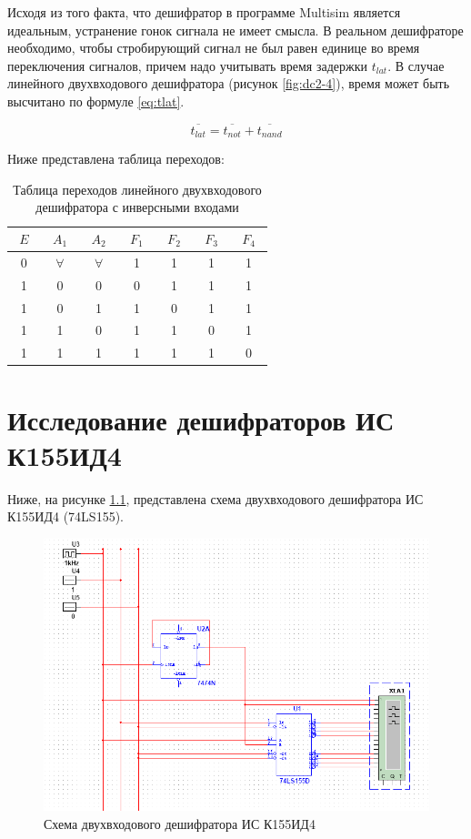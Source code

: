 Исходя из того факта, что дешифратор в программе Multisim является идеальным, устранение гонок сигнала не имеет смысла. В реальном дешифраторе необходимо, чтобы стробирующий сигнал не был равен единице во время переключения сигналов, причем надо учитывать время задержки $t_{lat}$. В случае линейного двухвходового дешифратора (рисунок \ref{fig:dc2-4}), время может быть высчитано по формуле \ref{eq:tlat}.

\begin{equation}
	\overline{t_{lat}} = \overline{t_{not}} + \overline{t_{nand}}
	\label{eq:tlat}
\end{equation}

Ниже представлена таблица переходов:

\begin{table}[ht]
	\centering
	\caption{Таблица переходов линейного двухвходового дешифратора с инверсными входами}
	\begin{tabular}{|c|c|c|c|c|c|c|}
		\hline
		$~~E~~$ & $~~A_1~~$ & $~~A_2~~$ & $~~F_1~~$ & $~~F_2~~$ & $~~F_3~~$ & $~~F_4~~$ \\
		\hline
		0 & $\forall$ & $\forall$ & 1 & 1 & 1 & 1 \\
		\hline
		1 & 0 & 0 & 0 & 1 & 1 & 1 \\
		\hline
		1 & 0 & 1 & 1 & 0 & 1 & 1 \\
		\hline
		1 & 1 & 0 & 1 & 1 & 0 & 1 \\
		\hline
		1 & 1 & 1 & 1 & 1 & 1 & 0 \\
		\hline
	\end{tabular}
\end{table}

\pagebreak

\chapter{Исследование дешифраторов ИС К155ИД4}

Ниже, на рисунке \ref{fig:2-74ls}, представлена схема двухвходового дешифратора ИС К155ИД4 (74LS155).

\begin{figure}[ht]
	\centering
	\includegraphics[width=\linewidth]{img/2-74LS}
	\caption{Схема двухвходового дешифратора ИС К155ИД4}
	\label{fig:2-74ls}
\end{figure}

